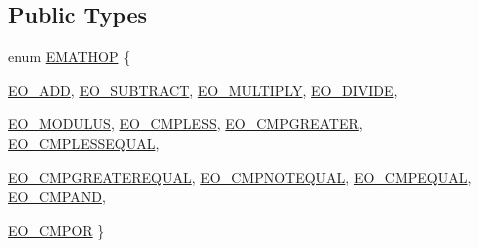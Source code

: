 \subsection*{Public Types}
\begin{CompactItemize}
\item 
enum \hyperlink{class_u_expr_8ca6700da0ea9a2a02d12dc70fd85e94}{EMATHOP} \{ \par
\hyperlink{class_u_expr_8ca6700da0ea9a2a02d12dc70fd85e94f4748c4d1015ba8bad7c88f681a3c101}{EO\_\-ADD}, 
\hyperlink{class_u_expr_8ca6700da0ea9a2a02d12dc70fd85e9454530e3cacd19be353604c274ba6cd53}{EO\_\-SUBTRACT}, 
\hyperlink{class_u_expr_8ca6700da0ea9a2a02d12dc70fd85e945a11f98dbb3d79925aff23a93b75d230}{EO\_\-MULTIPLY}, 
\hyperlink{class_u_expr_8ca6700da0ea9a2a02d12dc70fd85e94a97d713957de0688465d51f478dd0a69}{EO\_\-DIVIDE}, 
\par
\hyperlink{class_u_expr_8ca6700da0ea9a2a02d12dc70fd85e944da4237264ba66c28f068ef376680219}{EO\_\-MODULUS}, 
\hyperlink{class_u_expr_8ca6700da0ea9a2a02d12dc70fd85e94cf41b65c013d9348a295bdcf2b4e368d}{EO\_\-CMPLESS}, 
\hyperlink{class_u_expr_8ca6700da0ea9a2a02d12dc70fd85e946c244cdcf1434b6963cee63d204f5e40}{EO\_\-CMPGREATER}, 
\hyperlink{class_u_expr_8ca6700da0ea9a2a02d12dc70fd85e942feb475153cfe608f64f57231da2e95d}{EO\_\-CMPLESSEQUAL}, 
\par
\hyperlink{class_u_expr_8ca6700da0ea9a2a02d12dc70fd85e94bbf6df6166421eb11d54b9a737228dc7}{EO\_\-CMPGREATEREQUAL}, 
\hyperlink{class_u_expr_8ca6700da0ea9a2a02d12dc70fd85e943f315d42801c281492cf196c214376a3}{EO\_\-CMPNOTEQUAL}, 
\hyperlink{class_u_expr_8ca6700da0ea9a2a02d12dc70fd85e9402061e6cf3a832cab18f9347810992d4}{EO\_\-CMPEQUAL}, 
\hyperlink{class_u_expr_8ca6700da0ea9a2a02d12dc70fd85e94af6fe03e4d3483a717722f5965ea0d37}{EO\_\-CMPAND}, 
\par
\hyperlink{class_u_expr_8ca6700da0ea9a2a02d12dc70fd85e94338842e48097917f1505e6f9779439af}{EO\_\-CMPOR}
 \}

\end{CompactItemize}
